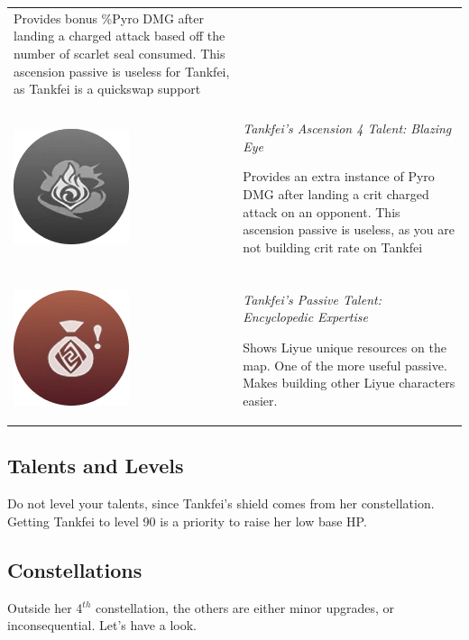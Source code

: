 \documentclass[11pt]{article}
\begin{document}
\begin{tabular}{m{} m{} }
 Provides bonus \%Pyro DMG after landing a charged attack based off the number of scarlet seal consumed. This ascension passive is useless for Tankfei, as Tankfei is a quickswap support \\
 \\
\includegraphics[scale = 0.27]{Ascension4_Greyscale.png} & \textit{Tankfei's Ascension 4 Talent: Blazing Eye} 

Provides an extra instance of Pyro DMG after landing a crit charged attack on an opponent. This ascension passive is useless, as you are not building crit rate on Tankfei \\
\\
\includegraphics[scale = 0.27]{Passive.png} & \textit{Tankfei's Passive Talent: Encyclopedic Expertise} 

Shows Liyue unique resources on the map. One of the more useful passive. Makes building other Liyue characters easier. \\

\end{tabular}

\subsection{Talents and Levels}

Do not level your talents, since Tankfei's shield comes from her constellation. Getting Tankfei to level 90 is a priority to raise her low base HP. 

\subsection{Constellations}

Outside her 4$^{th}$ constellation, the others are either minor upgrades, or inconsequential. Let's have a look.
\end{document}
